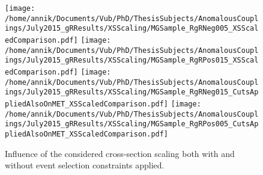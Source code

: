 \begin{figure}[h!t]
 \centering
 \texttt{[image: /home/annik/Documents/Vub/PhD/ThesisSubjects/AnomalousCouplings/July2015\_gRResults/XSScaling/MGSample\_RgRNeg005\_XSScaledComparison.pdf]}
 \texttt{[image: /home/annik/Documents/Vub/PhD/ThesisSubjects/AnomalousCouplings/July2015\_gRResults/XSScaling/MGSample\_RgRPos015\_XSScaledComparison.pdf]}
 \texttt{[image: /home/annik/Documents/Vub/PhD/ThesisSubjects/AnomalousCouplings/July2015\_gRResults/XSScaling/MGSample\_RgRNeg015\_CutsAppliedAlsoOnMET\_XSScaledComparison.pdf]}
 \texttt{[image: /home/annik/Documents/Vub/PhD/ThesisSubjects/AnomalousCouplings/July2015\_gRResults/XSScaling/MGSample\_RgRPos005\_CutsAppliedAlsoOnMET\_XSScaledComparison.pdf]}
 \caption{Influence of the considered cross-section scaling both with and without event selection constraints applied.} \label{fig::XSScaling}
\end{figure}




